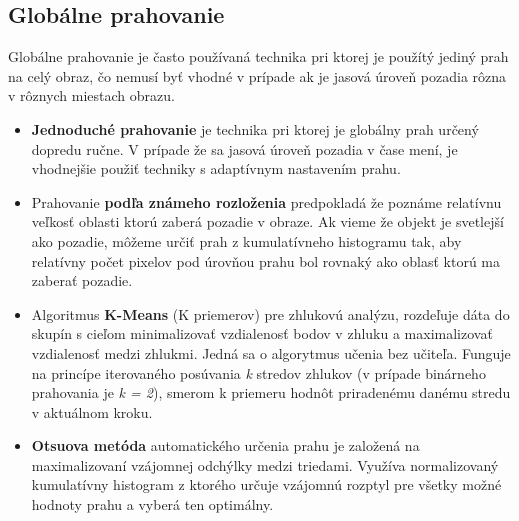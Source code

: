 \subsection{Globálne prahovanie}

    Globálne prahovanie je často používaná technika pri ktorej je použítý jediný prah na celý obraz, čo nemusí byť vhodné v prípade ak je jasová úroveň pozadia rôzna v rôznych miestach obrazu.

    \begin{itemize}
        \item \textbf{Jednoduché prahovanie} je technika pri ktorej je globálny prah určený dopredu ručne. V prípade že sa jasová úroveň pozadia v čase mení, je vhodnejšie použiť techniky s adaptívnym nastavením prahu.

        \item Prahovanie \textbf{podľa známeho rozloženia} predpokladá že poznáme relatívnu veľkosť oblasti ktorú zaberá pozadie v obraze. Ak vieme že objekt je svetlejší ako pozadie, môžeme určiť prah z kumulatívneho histogramu tak, aby relatívny počet pixelov pod úrovňou prahu bol rovnaký ako oblasť ktorú ma zaberať pozadie.

        \item Algoritmus \textbf{K-Means} (K priemerov) pre zhlukovú analýzu, rozdeľuje dáta do skupín s cieľom minimalizovať vzdialenosť bodov v zhluku a maximalizovať vzdialenosť medzi zhlukmi. Jedná sa o algorytmus učenia bez učiteľa. Funguje na princípe iterovaného posúvania \emph{k} stredov zhlukov (v prípade binárneho prahovania je \emph{k = 2}), smerom k priemeru hodnôt priradenému danému stredu v aktuálnom kroku.

        \item \textbf{Otsuova metóda} automatického určenia prahu je založená na maximalizovaní vzájomnej odchýlky medzi triedami. Využíva normalizovaný kumulatívny histogram z ktorého určuje vzájomnú rozptyl pre všetky možné hodnoty prahu a vyberá ten optimálny. 
    \end{itemize}


